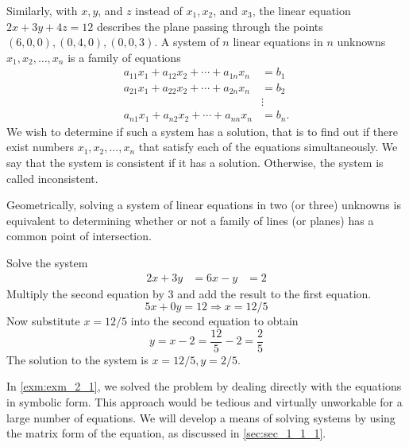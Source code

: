 \documentclass[../main.tex]{subfiles}
\begin{document}
Similarly, with $x, y$, and $z$ instead of $x_{1}, x_{2}$, and $x_{3}$, the linear equation $2 x+3 y+4 z=12$ describes the plane passing through the points $(6,0,0),(0,4,0),(0,0,3)$. A system of $n$ linear equations in $n$ unknowns $x_{1}, x_{2}, \ldots, x_{n}$ is a family of equations
$$
\begin{aligned}
a_{11} x_{1}+a_{12} x_{2}+\cdots+a_{1 n} x_{n}&=b_{1} \\
a_{21} x_{1}+a_{22} x_{2}+\cdots+a_{2 n} x_{n}&=b_{2} \\
&\vdots \\
a_{n 1} x_{1}+a_{n 2} x_{2}+\cdots+a_{n n} x_{n}&=b_{n} .
\end{aligned}
$$
We wish to determine if such a system has a solution, that is to find out if there exist numbers $x_{1}, x_{2}, \ldots, x_{n}$ that satisfy each of the equations simultaneously. We say that the system is consistent if it has a solution. Otherwise, the system is called inconsistent.

Geometrically, solving a system of linear equations in two (or three) unknowns is equivalent to determining whether or not a family of lines (or planes) has a common point of intersection.


\begin{example} Solve the system
	\label{exm:exm_2_1}
	$$
	\begin{aligned}
	2 x+3 y&=6
	x-y&=2
	\end{aligned}
	$$
Multiply the second equation by 3 and add the result to the first equation.
$$5 x+0 y=12 \Longrightarrow x=12 / 5$$
Now substitute $x=12 / 5$ into the second equation to obtain $$y=x-2=\frac{12}{5}-2=\frac{2}{5}$$
The solution to the system is $x=12 / 5, y=2 / 5$.
\end{example}

In \autoref{exm:exm_2_1}, we solved the problem by dealing directly with the equations in symbolic form. This approach would be tedious and virtually unworkable for a large number of equations. We will develop a means of solving systems by using the matrix form of the equation, as discussed in \autoref{sec:sec_1_1_1}.
\end{document}
